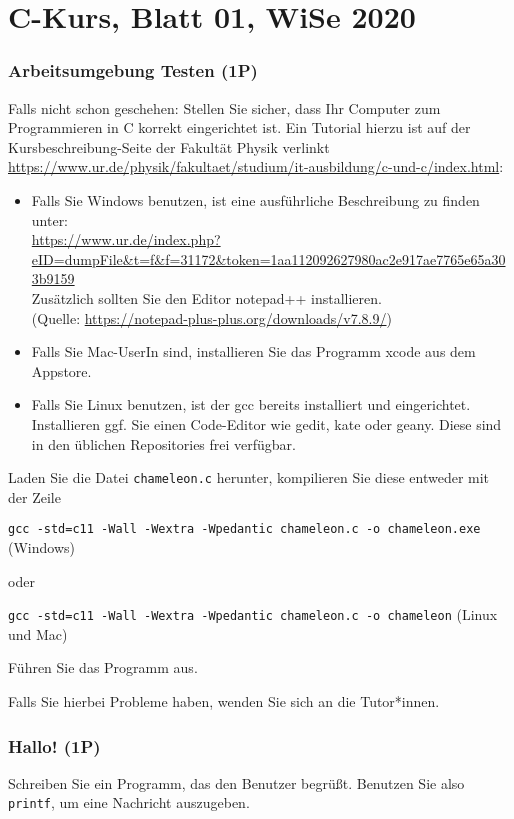 \documentclass[
	ngerman,
	fontsize=10pt,
	parskip=half,
	titlepage=true,
	DIV=12
]{scrartcl}
\newcommand*{\inC}[1]{\texttt{#1}}
\begin{document}
\part*{C-Kurs, Blatt 01, WiSe 2020}

\section{Arbeitsumgebung Testen (1P)}
Falls nicht schon geschehen: Stellen Sie sicher, dass Ihr Computer zum Programmieren in C korrekt eingerichtet ist. Ein Tutorial hierzu ist auf der Kursbeschreibung-Seite der Fakultät Physik verlinkt \url{https://www.ur.de/physik/fakultaet/studium/it-ausbildung/c-und-c/index.html}:
\begin{itemize}
\item Falls Sie Windows benutzen, ist eine ausführliche Beschreibung zu finden unter: \\
	\url{https://www.ur.de/index.php?eID=dumpFile&t=f&f=31172&token=1aa112092627980ac2e917ae7765e65a303b9159} \\
	Zusätzlich sollten Sie den Editor notepad++ installieren.\\
	(Quelle: \url{https://notepad-plus-plus.org/downloads/v7.8.9/})
\item Falls Sie Mac-UserIn sind, installieren Sie das Programm xcode aus dem Appstore.
\item Falls Sie Linux benutzen, ist der gcc bereits installiert und eingerichtet. Installieren ggf. Sie einen Code-Editor wie gedit, kate oder geany. Diese sind in den
	üblichen Repositories frei verfügbar.
\end{itemize}

Laden Sie die Datei \texttt{chameleon.c} herunter, kompilieren Sie diese entweder mit der Zeile
\begin{center}
\texttt{gcc -std=c11 -Wall -Wextra -Wpedantic chameleon.c -o chameleon.exe} (Windows)
\end{center}
oder
\begin{center}
\texttt{gcc -std=c11 -Wall -Wextra -Wpedantic chameleon.c -o chameleon} (Linux und Mac)
\end{center}

Führen Sie das Programm aus.

Falls Sie hierbei Probleme haben, wenden Sie sich an die Tutor*innen.



\section{Hallo! (1P)}
Schreiben Sie ein Programm, das den Benutzer begrüßt. Benutzen Sie also \inC{printf}, um eine Nachricht auszugeben.
\end{document}
